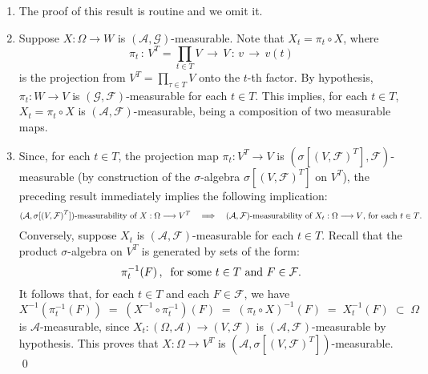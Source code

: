 \proof
\begin{enumerate}
\item	The proof of this result is routine and we omit it.
\item	Suppose $X : \Omega \longrightarrow W$ is $(\mathcal{A},\mathcal{G})$-measurable.
		Note that $X_{t} = \pi_{t} \circ X$, where
		\begin{equation*}
		\pi_{t} \,:\, V^{T} = \prod_{t\in T}V \,\longrightarrow\, V \,:\, v \,\longrightarrow\, v(t)
		\end{equation*}
		is the projection from $V^{T} = \prod_{\tau\in T}V$ onto the $t$-th factor.
		By hypothesis, $\pi_{t} : W \longrightarrow V$ is $(\mathcal{G},\mathcal{F})$-measurable
		for each $t \in T$.
		This implies, for each $t \in T$, $X_{t} = \pi_{t} \circ X$ is
		$(\mathcal{A},\mathcal{F})$-measurable, being a composition of two measurable maps.
\item	Since, for each $t \in T$, the projection map $\pi_{t} : V^{T} \longrightarrow V$ is
		$\left(\sigma[\left(V,\mathcal{F}\right)^{T}],\mathcal{F}\right)$-measurable
		(by construction of the $\sigma$-algebra $\sigma[\left(V,\mathcal{F}\right)^{T}]$ on $V^{T}$),
		the preceding result immediately implies the following implication:
		\begin{equation*}
		\textnormal{$(\mathcal{A},\sigma[\left(V,\mathcal{F}\right)^{T}])$-measurability
		of $X : \Omega \longrightarrow V^{T}$}
		\quad\Longrightarrow\quad
		\textnormal{$\left(\mathcal{A},\mathcal{F}\right)$-measurability
		of $X_{t} : \Omega \longrightarrow V$, for each $t \in T$}.
		\end{equation*}
		Conversely, suppose $X_{t}$ is $(\mathcal{A},\mathcal{F})$-measurable for each $t \in T$.
		Recall that the product $\sigma$-algebra on $V^{T}$ is generated by
		sets of the form:
		\begin{equation*}
			\pi^{-1}_{t}\!\left(F\right),
			\;\;\textnormal{for some $t \in T$ and $F \in \mathcal{F}$}.
		\end{equation*}
		It follows that, for each $t \in T$ and each $F \in \mathcal{F}$, we have
		\begin{equation*}
			X^{-1}\!\left(\pi^{-1}_{t}\!\left(F\right)\right)
			\; = \; (X^{-1}\circ\pi^{-1}_{t})\!\left(F\right)
			\; = \; (\pi_{t} \circ X)^{-1}\!\left(F\right)
			\; = \; X_{t}^{-1}\!\left(F\right)
			\; \subset \; \Omega
		\end{equation*}
		is $\mathcal{A}$-measurable, since
		$X_{t} : (\Omega,\mathcal{A}) \longrightarrow (V,\mathcal{F})$
		is $(\mathcal{A},\mathcal{F})$-measurable by hypothesis.
		This proves that $X : \Omega \longrightarrow V^{T}$ is
		$(\mathcal{A},\sigma[(V,\mathcal{F})^{T}])$-measurable. \qed
\end{enumerate}

